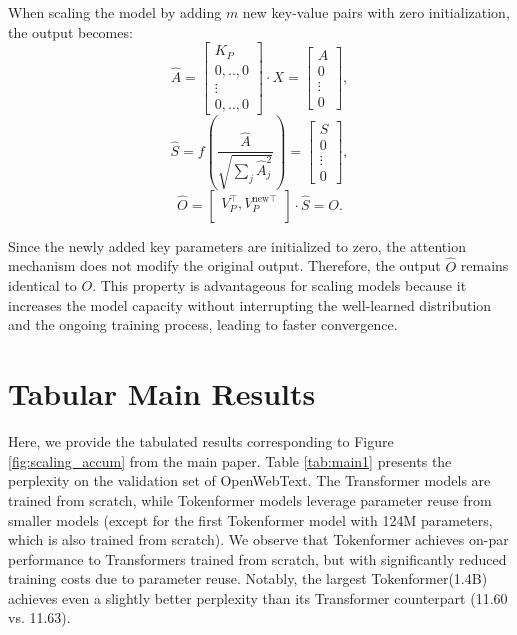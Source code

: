 \documentclass{article} %
\newcommand{\ourmethod}{Tokenformer\xspace}
\begin{document}
When scaling the model by adding $m$ new key-value pairs with zero initialization, the output becomes:
\begin{equation}
    \hat{A} = \begin{bmatrix}
        K_P\\
        0,..,0\\
        \vdots\\
        0,..,0
    \end{bmatrix} \cdot X = \begin{bmatrix}
        A\\
        0\\
        \vdots\\
        0
    \end{bmatrix},
    \label{eq:token-parameter-1}
\end{equation}
\begin{equation}
    \hat{S} = f(\frac{\hat{A}}{\sqrt{\sum_j \hat{A}_j^2}}) = \begin{bmatrix}
        S\\
        0\\
        \vdots\\
        0
    \end{bmatrix},
    \label{eq:token-parameter-2}
\end{equation}
\begin{equation}
    \hat{O} = \begin{bmatrix}
        V_P^{\top}, V_P^{\text{new}\top}\\
    \end{bmatrix} \cdot \hat{S} = O.
    \label{eq:token-parameter-2}
\end{equation}

Since the newly added key parameters are initialized to zero, the attention mechanism does not modify the original output. Therefore, the output $\hat{O}$ remains identical to $O$.
This property is advantageous for scaling models because it increases the model capacity without interrupting the well-learned distribution and the ongoing training process, leading to faster convergence.

\section{Tabular Main Results}
Here, we provide the tabulated results corresponding to Figure \ref{fig:scaling_accum} from the main paper.
Table \ref{tab:main1} presents the perplexity on the validation set of OpenWebText. The Transformer models are trained from scratch, while \ourmethod models leverage parameter reuse from smaller models (except for the first \ourmethod model with 124M parameters, which is also trained from scratch).
We observe that \ourmethod achieves on-par performance to Transformers trained from scratch, but with significantly reduced training costs due to parameter reuse. Notably, the largest \ourmethod (1.4B) achieves even a slightly better perplexity than its Transformer counterpart (11.60 vs. 11.63).
\end{document}
